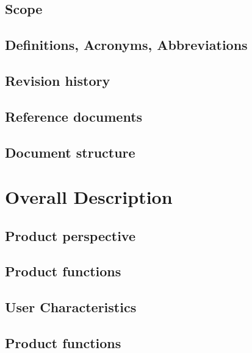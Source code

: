 \documentclass[a4paper,oneside,11pt]{article}
\begin{document}
        \subsection{Scope}
            
        \subsection{Definitions, Acronyms, Abbreviations}
            
        \subsection{Revision history}
         
        \subsection{Reference documents}
            
        \subsection{Document structure}
        
        
    \newpage
    \section{Overall Description}
        \subsection{Product perspective}
            
        \subsection{Product functions}
            
        \subsection{User Characteristics}
            
        \subsection{Product functions}
            
\end{document}
